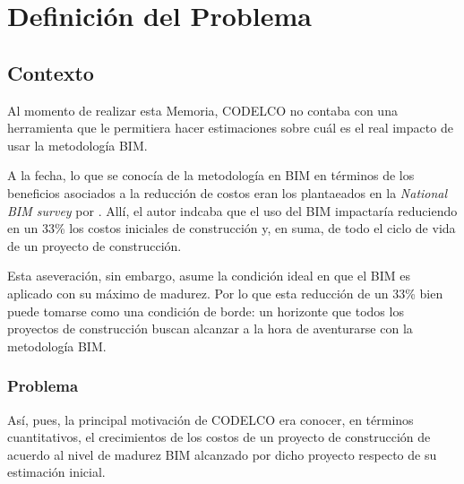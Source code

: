 \chapter{Definición del Problema}

\section{Contexto}

Al momento de realizar esta Memoria, CODELCO no contaba con una herramienta que le permitiera hacer estimaciones sobre cuál es el real impacto de usar la metodología BIM.

A la fecha, lo que se conocía de la metodología en BIM en términos de los beneficios asociados a la reducción de costos eran los plantaeados en la \textit{National BIM survey} por . Allí, el autor indcaba que el uso del BIM impactaría reduciendo en un 33\% los costos iniciales de construcción y, en suma, de todo el ciclo de vida de un proyecto de construcción.

Esta aseveración, sin embargo, asume la condición ideal en que el BIM es aplicado con su máximo de madurez. Por lo que esta reducción de un 33\% bien puede tomarse como una condición de borde: un horizonte que todos los proyectos de construcción buscan alcanzar a la hora de aventurarse con la metodología BIM.


\subsection{Problema}

Así, pues, la principal motivación de CODELCO era conocer, en términos cuantitativos, el crecimientos de los costos de un proyecto de construcción de acuerdo al nivel de madurez BIM alcanzado por dicho proyecto respecto de su estimación inicial.